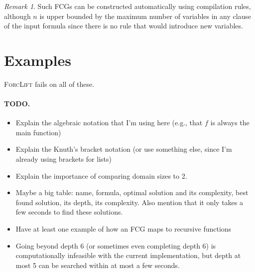 \documentclass{article}
\theoremstyle{definition}
\theoremstyle{remark}
\newtheorem*{remark}{Remark}
\begin{document}
\begin{remark}
  Such FCGs can be constructed automatically using compilation rules, although $n$ is upper bounded by the maximum number of variables in any clause of the input formula since there is no rule that would introduce new variables.
\end{remark}

\section{Examples}

\textsc{ForcLift} fails on all of these.

\paragraph{TODO.}
\begin{itemize}
\item Explain the algebraic notation that I'm using here (e.g., that $f$ is always the main function)
\item Explain the Knuth's bracket notation (or use something else, since I'm already using brackets for lists)
\item Explain the importance of comparing domain sizes to 2.
\item Maybe a big table: name, formula, optimal solution and its complexity, best found solution, its depth, its complexity. Also mention that it only takes a few seconds to find these solutions.
\item Have at least one example of how an FCG maps to recursive functions
\item Going beyond depth 6 (or sometimes even completing depth 6) is computationally infeasible with the current implementation, but depth at most 5 can be searched within at most a few seconds.
\end{itemize}
\end{document}
